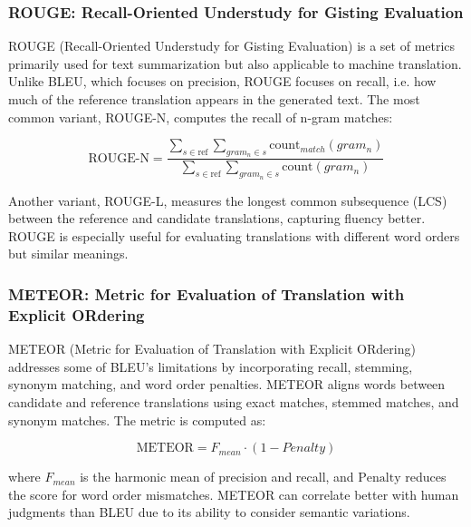 \subsubsection{ROUGE: Recall-Oriented Understudy for Gisting Evaluation}
ROUGE (Recall-Oriented Understudy for Gisting Evaluation) \cite{linROUGEPackageAutomatic2004} is a set of metrics primarily used for text summarization but 
also applicable to machine translation. Unlike BLEU, which focuses on precision, ROUGE focuses on recall, i.e. how much of the reference translation appears in the generated text. 
The most common variant, ROUGE-N, computes the recall of n-gram matches:

\begin{equation}
\text{ROUGE-N} = \frac{\sum_{s \in \text{ref}} \sum_{gram_n \in s} \text{count}_{match}(gram_n)}{\sum_{s \in \text{ref}} \sum_{gram_n \in s} \text{count}(gram_n)}
\end{equation}

Another variant, ROUGE-L, measures the longest common subsequence (LCS) between the reference and candidate translations, capturing 
fluency better. ROUGE is especially useful for evaluating translations with different word orders but similar meanings.

\subsubsection{METEOR: Metric for Evaluation of Translation with Explicit ORdering}
METEOR (Metric for Evaluation of Translation with Explicit ORdering) addresses some of BLEU's limitations by incorporating recall, stemming, synonym matching, and word order penalties. 
METEOR aligns words between candidate and reference translations using exact matches, stemmed matches, and synonym matches. The metric is computed as:

\begin{equation}
\text{METEOR} = F_{mean} \cdot (1 - Penalty)
\end{equation}

where $ F_{mean} $ is the harmonic mean of precision and recall, and $\text{Penalty}$ reduces the score for word order mismatches. METEOR can correlate better with human judgments than BLEU 
due to its ability to consider semantic variations.


